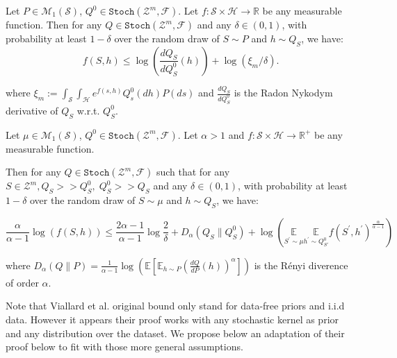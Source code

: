 \begin{proposition}
\label{prop: rivasplata_disintegrated}
 Let $P \in \mathcal{M}_{1}(\mathcal{S})$, $Q^{0} \in \texttt{Stoch}(\mathcal{Z}^m,\mathcal{F})$. Let $f: \mathcal{S} \times \mathcal{H} \rightarrow \mathbb{R}$ be any measurable function.
Then for any $Q \in \texttt{Stoch}(\mathcal{Z}^m,\mathcal{F})$ and any $\delta \in(0,1)$, with probability at least $1-\delta$ over the random draw of $S \sim P$ and $h\sim Q_S$, we have:
$$
f(S,h) \leq \log\left(\frac{dQ_{S}}{dQ_{S}^{0}}(h) \right)+\log (\xi_m / \delta) .
$$

where $\xi_m:=\int_{\mathcal{S}} \int_{\mathcal{H}} e^{f(s, h)} Q_{s}^{0}(d h) P(d s)$ and $\frac{dQ_{S}}{dQ_{S}^{0}}$ is the Radon Nykodym derivative of $Q_S$ w.r.t. $Q_S^0$.
\end{proposition}


\begin{proposition}
  \label{prop: viallard_disintegrated}
   Let $\mu \in \mathcal{M}_{1}(\mathcal{S})$, $Q^{0} \in \texttt{Stoch}(\mathcal{Z}^m,\mathcal{F})$. Let  $\alpha>1$ and  $f: \mathcal{S} \times \mathcal{H} \rightarrow \mathbb{R}^+$ be any measurable function.

   Then for any $Q \in \texttt{Stoch}(\mathcal{Z}^m,\mathcal{F})$ such that for any $S\in\mathcal{Z}^m, Q_S>>Q_S^0,\; Q_S^0>>Q_S $ and any $\delta \in(0,1)$, with probability at least $1-\delta$ over the random draw of $S \sim \mu$ and $h\sim Q_S$, we have:

   \[\frac{\alpha}{\alpha-1} \log (f(S,h)) \leq \frac{2 \alpha-1}{\alpha-1} \log \frac{2}{\delta}+D_{\alpha}\left(Q_{S} \| Q_S^0\right)+
   \log \left(\underset{S^{\prime} \sim \mu}{\mathbb{E}} \underset{h^{\prime} \sim Q_{S'}^0}{\mathbb{E}}
   f\left(S^{\prime},h^{\prime}\right)^{\frac{\alpha}{\alpha-1}}\right) \]

   where $D_\alpha(Q\|P)= \frac{1}{\alpha-1}\log\left( \mathbb{E}\left[ \mathbb{E}_{h\sim P} \left(\frac{dQ}{dP}(h)\right)^\alpha   \right] \right)$ is the Rényi diverence of order $\alpha$.

\end{proposition}

Note that Viallard et al. original bound only stand for data-free priors and i.i.d data. However it appears their proof works with any stochastic kernel as prior and any distribution over the dataset. We propose below an adaptation of their proof below to fit with those more general assumptions.


